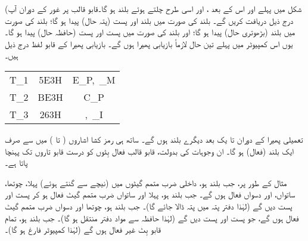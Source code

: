 (شکل   میں پہلے  اور اس کے بعد  ، اور اسی طرح چلتے ہوئے    بلند ہو گا۔قابو قالب پر غور کے دوران آپ درج ذیل دریافت کریں گے۔ بلند  کی صورت میں بلند  اور پست  (پتہ  حال)  پیدا ہو گا؛ بلند  کی صورت میں  بلند  (بڑھوتری  حال) پیدا ہو گا؛ اور بلند  کی صورت میں پست  اور پست   (حافظہ حال) پیدا ہو گا۔ یوں اس کمپیوٹر میں پہلے تین  حال لازماً  بازیابی پھیرا ہوں گے۔ بازیابی پھیرا کے قابو لفظ درج ذیل ہیں۔
\begin{center}
\begin{tabular}{CCC}
\toprule
{}&&\\
\midrule
T_1&5E3H&E_P,\, _M\\
T_2&BE3H&C_P\\
T_3&263H&,\, _I\\
\bottomrule
\end{tabular}
\end{center}

تعمیلی پھیرا کے دوران  تا  یک بعد دیگرے  بلند  ہوں گے۔ ساتھ ہی رمز کشا اشاروں (  تا ) میں سے صرف ایک  بلند (فعال) ہو گا۔ ان وجوہات کی بدولت،  قابو قالب  فعال بِٹوں کو   درست  قابو تاروں تک پہنچا پاتا  ہے۔

مثال کے طور پر، جب بلند ہو،   داخلی ضرب متمم گیٹوں میں (نیچے سے گنتے ہوئے)   پہلا، چوتھا، ساتواں، اور دسواں فعال ہوں گے۔ جب  بلند ہو، پہلا اور ساتواں ضرب متمم  گیٹ فعال ہو کر پست  اور پست    دیں گے  (لہٰذا  دفتر پتہ میں پتہ  ڈالا جائے گا)۔ جب  بلند ہو، چوتھا اور  دسواں ضرب متمم گیٹ فعال ہوں گے، جو پست  اور  پست  دیں گے (لہٰذا حافظہ سے مواد دفتر  منتقل ہو گا)۔ جب  بلند ہو، تمام قابو بِٹ  غیر فعال ہوں گے (لہٰذا کمپیوٹر فارغ ہو گا)۔

